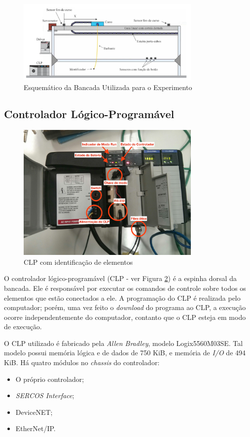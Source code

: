 \begin{figure}[hbt]
\centering
  \includegraphics[width=0.8\textwidth]{figs/fundamentos/bancadaEsquematico}
  \caption{Esquemático da Bancada Utilizada para o Experimento \cite{redytton}\label{bancadaEsquematico}}
\end{figure}

\subsection{Controlador Lógico-Programável}
\begin{figure}[!ht]
  \centering
    \includegraphics[width=0.8\textwidth]{figs/fundamentos/CLP.jpg}
    \caption{CLP com identificação de elementos\label{CLPcomentado}}
\end{figure}

O controlador lógico-programável (CLP - ver Figura \ref{CLPcomentado}) é a espinha dorsal da bancada. Ele é responsável por executar os comandos de controle sobre todos os elementos que estão conectados a ele. A programação do CLP é realizada pelo computador; porém, uma vez feito o \textit{download} do programa ao CLP, a execução ocorre independentemente do computador, contanto que o CLP esteja em modo de execução.

O CLP utilizado é fabricado pela \textit{Allen Bradley}, modelo Logix5560M03SE. Tal modelo possui memória lógica e de dados de 750 KiB, e memória de \textit{I/O} de 494 KiB. Há quatro módulos no \textit{chassis} do controlador:
\begin{itemize}
  \item O próprio controlador;
  \item \textit{SERCOS Interface};
  \item DeviceNET;
  \item EtherNet/IP.
\end{itemize}

